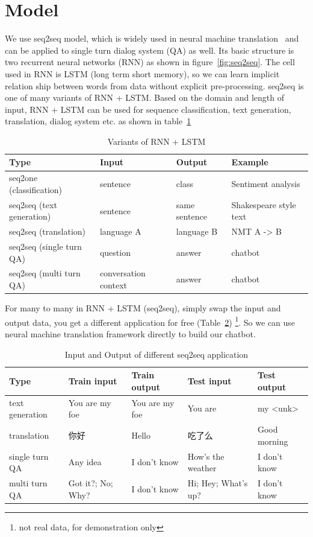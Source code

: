 \documentclass{article}
\begin{document}
\section{Model}
\label{sec:model}

We use seq2seq model, which is widely used in neural machine translation~\cite{sutskever2014sequence}
and can be applied to single turn dialog system (QA) as well.
Its basic structure is two recurrent neural networks (RNN) as shown in figure~\ref{fig:seq2seq}.
The cell used in RNN is LSTM (long term short memory),
so we can learn implicit relation ship between words from data without explicit pre-processing.
seq2seq is one of many variants of RNN + LSTM. Based on the domain and length of input,
RNN + LSTM can be used for sequence classification, text generation, translation, dialog system etc.
as shown in table~\ref{table:RNN+LSTM}

\begin{table}[h]
    \caption{Variants of RNN + LSTM}
    \label{table:RNN+LSTM}
    \centering
    \begin{tabular}{llll}
        \toprule
        Type & Input & Output & Example \\
        \midrule
        seq2one (classification) & sentence & class & Sentiment analysis \\
        seq2seq (text generation) & sentence & same sentence & Shakespeare style text \\
        seq2seq (translation) & language A & language B & NMT A -> B \\
        seq2seq (single turn QA) & question & answer & chatbot \\
        seq2seq (multi turn QA) & conversation context & answer & chatbot \\
        \bottomrule
    \end{tabular}
\end{table}

For many to many in RNN + LSTM (seq2seq), simply swap the input and output data, you get a different application for free
(Table~\ref{table:seq2seq-app}) \footnote{not real data, for demonstration only}.
So we can use neural machine translation framework directly to build our chatbot.

\begin{table}[h]
    \caption{Input and Output of different seq2seq application}
    \label{table:seq2seq-app}
    \centering
    \begin{tabular}{lllll}
        \toprule
        Type & Train input & Train output & Test input & Test output \\
        \midrule
        text generation & You are my foe & You are my foe & You are & my <unk>\\
        translation & {\cjkfont 你好} & Hello & {\cjkfont 吃了么} & Good morning \\
        single turn QA & Any idea & I don't know & How's the weather & I don't know \\
        multi turn QA & Got it?; No; Why? & I don't know & Hi; Hey; What's up? & I don't know \\
        \bottomrule
    \end{tabular}
\end{table}
\end{document}
